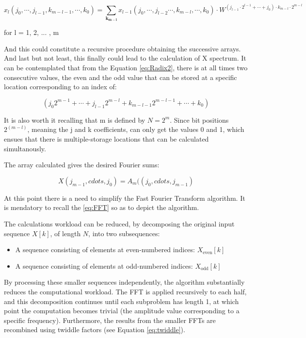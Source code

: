 {\begin{equation}
	x_{l}(j_0, \cdots, j_{l-1} , k_{m-l-1} , \cdots, k_0) = \sum_{\mathbf{k_{m-l}}} x_{l-1}(j_0, \cdots , j_{l-2} \cdots, k_{m-l} , \cdots , k_0) \cdot  W^{(j_{l-1} \cdot 2^{l-1} + \cdots + j_0) \cdot k_{m-l} \cdot 2^{m-l}}
	\label{eq:Radix2}
\end{equation}

for l = 1, 2, ... , m

And this could constitute a recursive procedure obtaining the successive arrays. And last but not least, this finally could lead to the calculation of X spectrum. It can be contemplated that from the Equation \eqref{eq:Radix2}, there is at all times two consecutive values, the even and the odd value that can be stored at a specific location corresponding to an index of: 

\begin{equation}
	(j_0 2^{m-1} + \cdots + j_{l-1} 2^{m-l} +  k_{m-l-1} 2^{m-l-1} + \cdots + k_0)
\end{equation}

It is also worth it recalling that m is defined by \( N = 2^m \). Since bit positions \( 2^(m-l) \), meaning the j and k coefficients, can only get the values 0 and 1, which ensues that there is multiple-storage locations that can be calculated simultanously.

The array calculated gives the desired Fourier sums: 

\begin{equation}
	X(j_{m-1}, cdots, j_0) = A_{m}((j_0 , cdots , j_{m-1})
\end{equation}


At this point there is a need to simplify the Fast Fourier Transform algorithm. It is mendatory to recall the \eqref{eq:FFT} so as to depict the algorithm. 

The calculations workload can be reduced, by decomposing the original input sequence \( X[k] \), of length \( N \), into two subsequences:

\begin{itemize}
    \item A sequence consisting of elements at even-numbered indices: \( X_{\text{even}}[k] \)
    \item A sequence consisting of elements at odd-numbered indices: \( X_{\text{odd}}[k] \)
\end{itemize}

By processing these smaller sequences independently, the algorithm substantially reduces the computational workload. The FFT is applied recursively to each half, and this decomposition continues until each subproblem has length 1, at which point the computation becomes trivial (the amplitude value corresponding to a specific frequency). Furthermore, the results from the smaller FFTs are recombined using twiddle factors (see Equation \eqref{eq:twiddle}).

}
